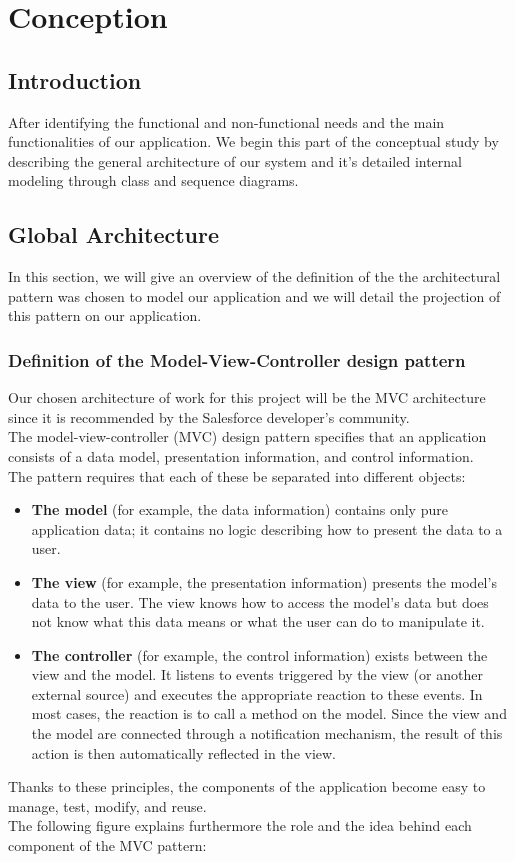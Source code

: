 \chapter{Conception}
\section*{Introduction}
After identifying the functional and non-functional needs and the main functionalities of our application. We begin this part
of the conceptual study by describing the general architecture of our system and
it's detailed internal modeling through class and sequence diagrams.
\section{Global Architecture}
In this section, we will give an overview of the definition of the
the architectural pattern was chosen to model our application and we will
detail the projection of this pattern on our application.

\subsection{Definition of the Model-View-Controller design pattern}
Our chosen architecture of work for this project will be the MVC  architecture since it is recommended by the Salesforce developer’s community.\\
The model-view-controller (MVC) design pattern specifies that an application consists of a data model, presentation information, and control information.\cite{5} \\
The pattern requires that each of these be separated into different objects:
\begin{itemize}
\item \textbf{The model} (for example, the data information) contains only pure application data; it contains no logic describing how to present the data to a user. \cite{5}
\item \textbf{The view} (for example, the presentation information) presents the model's data to the user. The view knows how to access the model's data but does not know what this data means or what the user can do to manipulate it. \cite{5}
\item \textbf{The controller} (for example, the control information) exists between the view and the model. It listens to events triggered by the view (or another external source) and executes the appropriate reaction to these events. In most cases, the reaction is to call a method on the model. Since the view and the model are connected through a notification mechanism, the result of this action is then automatically reflected in the view.\cite{5}
\end{itemize}
Thanks to these principles, the components of the application become easy to
manage, test, modify, and reuse.\\
The following figure explains furthermore the role and the idea behind each component of the MVC pattern:

